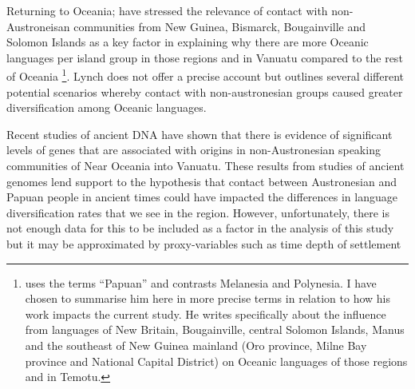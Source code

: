 \documentclass[a4paper,10pt]{article} %
\begin{document}
Returning to Oceania; \citet[104]{lynch1981melanesian} have stressed the relevance of contact with non-Austroneisan communities from New Guinea, Bismarck, Bougainville and Solomon Islands as a key factor in explaining why there are more Oceanic languages per island group in those regions and in Vanuatu compared to the rest of Oceania \footnote{\citet{lynch1981melanesian} uses the terms ``Papuan'' and contrasts Melanesia and Polynesia. I have chosen to summarise him here in more precise terms in relation to how his work impacts the current study. He writes specifically about the influence from languages of New Britain, Bougainville, central Solomon Islands, Manus and the southeast of New Guinea mainland (Oro province, Milne Bay province and National Capital District) on Oceanic languages of those regions and in Temotu.}. Lynch does not offer a precise account but outlines several different potential scenarios whereby contact with non-austronesian groups caused greater diversification among Oceanic languages.


Recent studies of ancient DNA \citep{lipson_harvad_ancient_dna_vanuatu_2018, posth_jena_ancient_dna_vanuatu_2018} have shown that there is evidence of significant levels of genes that are associated with origins in non-Austronesian speaking communities of Near Oceania into Vanuatu. These results from studies of ancient genomes lend support to the hypothesis that contact between Austronesian and Papuan people in ancient times could have impacted the differences in language diversification rates that we see in the region. However, unfortunately, there is not enough data for this to be included as a factor in the analysis of this study but it may be approximated by proxy-variables such as time depth of settlement


\end{document}
